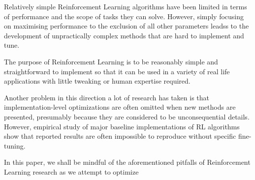 Relatively simple Reinforcement Learning algorithms have been limited in terms of performance and the scope of tasks they can solve. However, simply focusing on maximising performance to the exclusion of all other parameters leadss to the development of unpractically complex methods that are hard to implement and tune.%

The purpose of Reinforcement Learning is to be reasonably simple and straightforward to implement so that it can be used in a variety of real life applications with little tweaking or human expertise required. %

Another problem in this direction a lot of research has taken is that implementation-level optimizations are often omitted when new methods are presented, presumably because they are considered to be unconsequential details. However, empirical study of  major baseline implementations of RL algorithms show that reported results are often impossible to reproduce without specific fine-tuning\cite{henderson2018deep}\cite{islam2017reproducibility}\cite{andrychowicz2021matters}\cite{dossa2021empirical}.


In this paper, we shall be mindful of the aforementioned pitfalls of Reinforcement Learning research as we attempt to optimize 